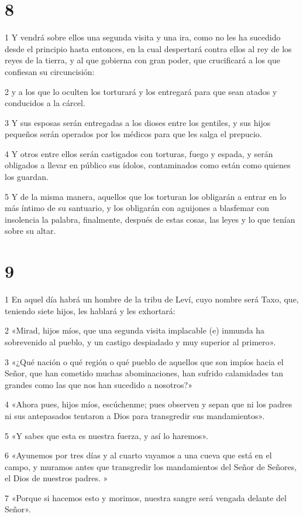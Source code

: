 \chapter{8}

\par 1 Y vendrá sobre ellos una segunda visita y una ira, como no les ha sucedido desde el principio hasta entonces, en la cual despertará contra ellos al rey de los reyes de la tierra, y al que gobierna con gran poder, que crucificará a los que confiesan su circuncisión:
\par 2 y a los que lo oculten los torturará y los entregará para que sean atados y conducidos a la cárcel.
\par 3 Y sus esposas serán entregadas a los dioses entre los gentiles, y sus hijos pequeños serán operados por los médicos para que les salga el prepucio.
\par 4 Y otros entre ellos serán castigados con torturas, fuego y espada, y serán obligados a llevar en público sus ídolos, contaminados como están como quienes los guardan.
\par 5 Y de la misma manera, aquellos que los torturan los obligarán a entrar en lo más íntimo de su santuario, y los obligarán con aguijones a blasfemar con insolencia la palabra, finalmente, después de estas cosas, las leyes y lo que tenían sobre su altar.

\chapter{9}

\par 1 En aquel día habrá un hombre de la tribu de Leví, cuyo nombre será Taxo, que, teniendo siete hijos, les hablará y les exhortará:
\par 2 «Mirad, hijos míos, que una segunda visita implacable (e) inmunda ha sobrevenido al pueblo, y un castigo despiadado y muy superior al primero».
\par 3 «¿Qué nación o qué región o qué pueblo de aquellos que son impíos hacia el Señor, que han cometido muchas abominaciones, han sufrido calamidades tan grandes como las que nos han sucedido a nosotros?»
\par 4 «Ahora pues, hijos míos, escúchenme; pues observen y sepan que ni los padres ni sus antepasados ​​tentaron a Dios para transgredir sus mandamientos».
\par 5 «Y sabes que esta es nuestra fuerza, y así lo haremos».
\par 6 «Ayunemos por tres días y al cuarto vayamos a una cueva que está en el campo, y muramos antes que transgredir los mandamientos del Señor de Señores, el Dios de nuestros padres. »
\par 7 «Porque si hacemos esto y morimos, nuestra sangre será vengada delante del Señor».

